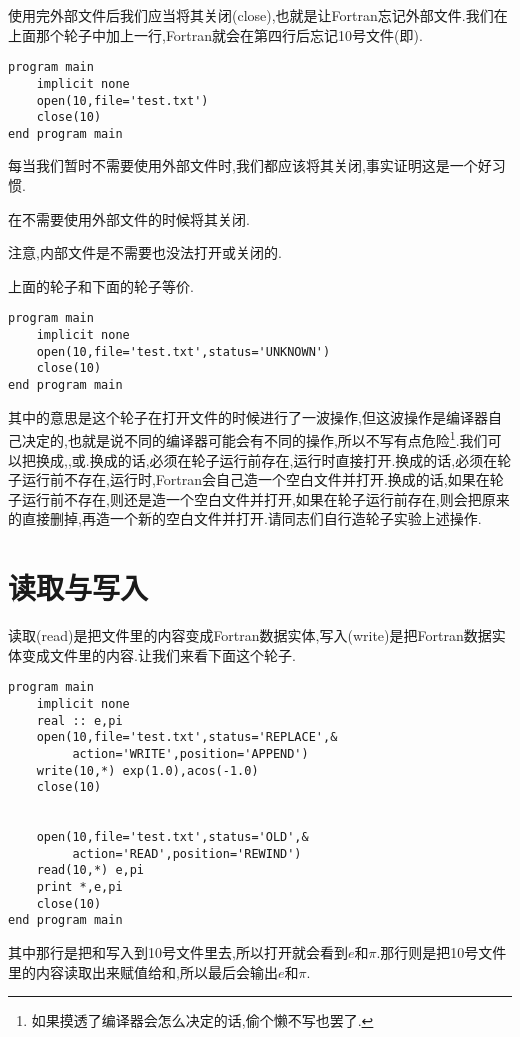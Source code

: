 使用完外部文件后我们应当将其关闭(close),也就是让Fortran忘记外部文件.我们在上面那个轮子中加上一行,Fortran就会在第四行后忘记10号文件(即).
\begin{lstlisting}
program main
    implicit none
    open(10,file='test.txt')
    close(10)
end program main
\end{lstlisting}

每当我们暂时不需要使用外部文件时,我们都应该将其关闭,事实证明这是一个好习惯.

\begin{convention}
    在不需要使用外部文件的时候将其关闭.
\end{convention}

注意,内部文件是不需要也没法打开或关闭的.

上面的轮子和下面的轮子等价.
\begin{lstlisting}
program main
    implicit none
    open(10,file='test.txt',status='UNKNOWN')
    close(10)
end program main
\end{lstlisting}
其中的意思是这个轮子在打开文件的时候进行了一波操作,但这波操作是编译器自己决定的,也就是说不同的编译器可能会有不同的操作,所以不写有点危险\footnote{如果摸透了编译器会怎么决定的话,偷个懒不写也罢了.\label{no_add}}.我们可以把换成,,或.换成的话,必须在轮子运行前存在,运行时直接打开.换成的话,必须在轮子运行前不存在,运行时,Fortran会自己造一个空白文件并打开.换成的话,如果在轮子运行前不存在,则还是造一个空白文件并打开,如果在轮子运行前存在,则会把原来的直接删掉,再造一个新的空白文件并打开.请同志们自行造轮子实验上述操作.

\section{读取与写入}

读取(read)是把文件里的内容变成Fortran数据实体,写入(write)是把Fortran数据实体变成文件里的内容.让我们来看下面这个轮子.
\begin{lstlisting}
program main
    implicit none
    real :: e,pi
    open(10,file='test.txt',status='REPLACE',&
         action='WRITE',position='APPEND')
    write(10,*) exp(1.0),acos(-1.0)
    close(10)


    open(10,file='test.txt',status='OLD',&
         action='READ',position='REWIND')
    read(10,*) e,pi
    print *,e,pi
    close(10)
end program main
\end{lstlisting}
其中那行是把和写入到10号文件里去,所以打开就会看到$e$和$\pi$.那行则是把10号文件里的内容读取出来赋值给和,所以最后会输出$e$和$\pi$.

